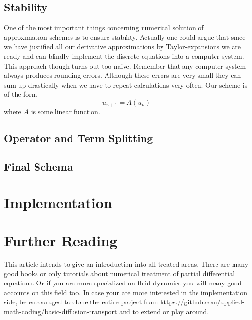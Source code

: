 \documentclass[]{article}
\begin{document}
\subsection{Stability}
One of the most important things concerning numerical solution of approximation
schemes is to ensure stability.
Actually one could argue that since we have justified all our derivative approximations by Taylor-expansions we are ready and can blindly implement the discrete equations into 
a computer-system. This approach though turns out too naive. Remember that any computer system always produces rounding errors. Although these errors are very small they can
sum-up drastically when we have to repeat calculations very often.
Our scheme is of the form 
\begin{equation}
u_{n+1}=A(u_{n})
\end{equation}
where $A$ is some linear function. 

 

\subsection{Operator and Term Splitting}

\subsection{Final Schema}

\section{Implementation}

\section{Further Reading}
This article intends to give an introduction into all treated areas.
There are many good books or only tutorials about numerical treatment of partial
differential equations. Or if you are more specialized on fluid dynamics you will
many good accounts on this field too. In case your are more interested in the 
implementation side, be encouraged to clone the entire project from https://github.com/applied-math-coding/basic-diffusion-transport and to extend or play around.
\end{document}
